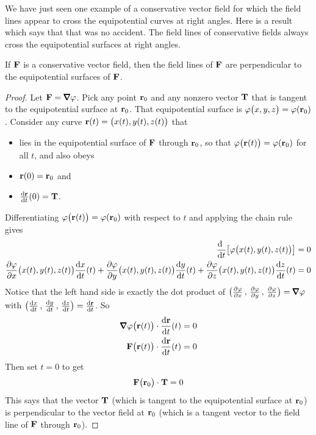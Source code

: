 We have just seen one example of a conservative vector field for which the
field lines appear to cross the equipotential curves at right angles.
Here is a result which says that that was no accident. The field lines of
conservative fields always cross the equipotential surfaces 
at right angles. 

\begin{lemma}[Optional]\label{lem:equipotential}
If $\mathbf{F}$ is a conservative vector field, then the field lines of $\mathbf{F}$
are perpendicular to the equipotential surfaces of $\mathbf{F}$.
\end{lemma}
\begin{proof}
Let $\vF=\vnabla\varphi$. 
Pick any point $\mathbf{r}_0$ and any nonzero vector $\mathbf{T}$ 
that is tangent to the equipotential surface at $\mathbf{r}_0$. That
equipotential surface is  $\varphi\big(x,y,z\big)=\varphi(\mathbf{r}_0)$.
Consider any curve $\mathbf{r}(t)=\big(x(t),y(t),z(t)\big)$ that 
\begin{itemize}\itemsep1pt \parskip0pt  %
\item[$\circ$]
lies in the equipotential surface of $\mathbf{F}$ through $\mathbf{r}_0$,
so that $\varphi\big(\mathbf{r}(t)\big)=\varphi(\mathbf{r}_0)$ for all $t$, 
and also obeys
\item[$\circ$]
$\mathbf{r}(0)=\mathbf{r}_0$ and
\item[$\circ$]
$\diff{\vr}{t}(0) = \vT$.
\end{itemize}
Differentiating $\varphi\big(\mathbf{r}(t)\big)=\varphi(\mathbf{r}_0)$
with respect to $t$ and applying the chain rule gives
\begin{align*}
\diff{\ }{t}\big[\varphi\big(x(t),y(t),z(t)\big)\big] &=0 \\
\frac{\partial\varphi}{\partial x}\big(x(t),y(t),z(t)\big)\diff{x}{t}(t)
+\frac{\partial\varphi}{\partial y}\big(x(t),y(t),z(t)\big)\diff{y}{t}(t)
+\frac{\partial\varphi}{\partial z}\big(x(t),y(t),z(t)\big)\diff{z}{t}(t)
&=0 
\end{align*}
Notice that the left hand side is exactly the dot product
of $\big(\frac{\partial\varphi}{\partial x}
\,,\,\frac{\partial\varphi}{\partial y}
\,,\,\frac{\partial\varphi}{\partial z}\big)=\vnabla\varphi$ 
with
$\big(\diff{x}{t}
\,,\,\diff{y}{t}
\,,\,\diff{z}{t}\big)
=\diff{\vr}{t}$.
So
\begin{align*}
\vnabla\varphi\big(\vr(t)\big)\cdot\diff{\vr}{t}(t) &= 0 \\
 \vF\big(\vr(t)\big)\cdot\diff{\vr}{t}(t) &= 0
\end{align*}
Then set $t=0$ to get
\begin{equation*}
 \mathbf{F}\big(\mathbf{r}_0\big)\cdot\mathbf{T} = 0
\end{equation*}
This says that the vector $\mathbf{T}$ (which is tangent to the equipotential 
surface at $\mathbf{r}_0$) is perpendicular 
to the vector field at $\mathbf{r}_0$ (which is a tangent vector to the 
field line of $\mathbf{F}$ through $\mathbf{r}_0$).
\end{proof}

